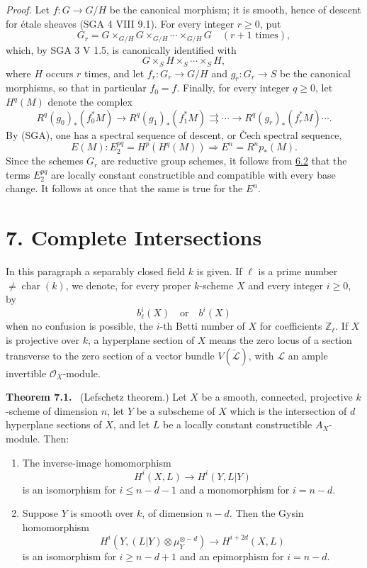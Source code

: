 \documentclass[11pt]{article}
\newenvironment{statement}[1]{\par\medskip\noindent\textbf{#1.}\ }{\par\medskip}
\begin{document}
\emph{Proof.} Let $f:G\to G/H$ be the canonical morphism; it is smooth, hence of descent for étale sheaves (SGA 4 VIII 9.1). For every integer $r\ge0$, put
\[
G_r=G\times_{G/H}G\times_{G/H}\cdots\times_{G/H}G
\quad(r+1\text{ times}),
\]
which, by SGA 3 V 1.5, is canonically identified with
\[
G\times_S H\times_S\cdots\times_S H,
\]
where $H$ occurs $r$ times, and let $f_r:G_r\to G/H$ and $g_r:G_r\to S$ be the canonical morphisms, so that in particular $f_0=f$. Finally, for every integer $q\ge0$, let $H^q(M)$ denote the complex
\[
R^q(g_0)_*(f_0^*M)\to R^q(g_1)_*(f_1^*M)\rightrightarrows\cdots\to R^q(g_r)_*(f_r^*M)\cdots .
\]
By (SGA), one has a spectral sequence of descent, or Čech spectral sequence,
\[
E(M):E_2^{pq}=H^p(H^q(M))\Rightarrow E^n=R^np_*(M).
\]
Since the schemes $G_r$ are reductive group schemes, it follows from \hyperref[sga5:VII:proposition:6.2]{6.2} that the terms $E_2^{pq}$ are locally constant constructible and compatible with every base change. It follows at once that the same is true for the $E^n$.

\section*{7. Complete Intersections}\label{sga5:VII:section:7}

In this paragraph a separably closed field $k$ is given. If $\ell$ is a prime number $\ne\operatorname{char}(k)$, we denote, for every proper $k$-scheme $X$ and every integer $i\ge0$, by
\[
b_\ell^i(X)\quad\text{or}\quad b^i(X)
\]
when no confusion is possible, the $i$-th Betti number of $X$ for coefficients $\mathbb Z_\ell$. If $X$ is projective over $k$, a hyperplane section of $X$ means the zero locus of a section transverse to the zero section of a vector bundle $V(\check{\mathcal L})$, with $\mathcal L$ an ample invertible $\mathcal O_X$-module.

\label{sga5:VII:theorem:7.1}\begin{statement}{Theorem 7.1}
(Lefschetz theorem.) Let $X$ be a smooth, connected, projective $k$-scheme of dimension $n$, let $Y$ be a subscheme of $X$ which is the intersection of $d$ hyperplane sections of $X$, and let $L$ be a locally constant constructible $A_X$-module. Then:
\begin{enumerate}[label=(\roman*)]
\item The inverse-image homomorphism
\[
H^i(X,L)\to H^i(Y,L|Y)
\]
is an isomorphism for $i\le n-d-1$ and a monomorphism for $i=n-d$.
\item Suppose $Y$ is smooth over $k$, of dimension $n-d$. Then the Gysin homomorphism
\[
H^i(Y,(L|Y)\otimes\mu_Y^{\otimes -d})\to H^{i+2d}(X,L)
\]
is an isomorphism for $i\ge n-d+1$ and an epimorphism for $i=n-d$.
\end{enumerate}
\end{statement}
\end{document}

